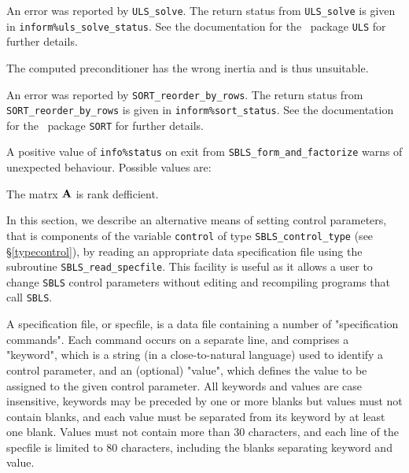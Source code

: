 \documentclass{galahad}
\newcommand{\packagename}{SBLS}
\begin{document}
\begin{description}
 An error was reported by {\tt ULS\_solve}. The return
status from {\tt ULS\_solve} is given in {\tt inform\%uls\_solve\_status}.
See the documentation for the \galahad\ package {\tt ULS} for further details.

 The computed preconditioner has the wrong 
inertia and is thus unsuitable.

 An error was reported by {\tt SORT\_reorder\_by\_rows}. 
The return status from {\tt SORT\_reorder\_by\_rows} 
is given in {\tt inform\%sort\_status}.
See the documentation for the \galahad\ package {\tt SORT} for further details.

\end{description}

A positive value of {\tt info\%status} on exit from 
{\tt \packagename\_form\_and\_factorize} warns of unexpected behaviour.
Possible values are:

\begin{description}

 The matrx ${\mathbf{A}}$ is rank defficient. 

\end{description}


\galfeatures
\noindent In this section, we describe an alternative means of setting 
control parameters, that is components of the variable {\tt control} of type
{\tt \packagename\_control\_type}
(see \S\ref{typecontrol}), 
by reading an appropriate data specification file using the
subroutine {\tt \packagename\_read\_specfile}. This facility
is useful as it allows a user to change  {\tt \packagename} control parameters 
without editing and recompiling programs that call {\tt \packagename}.

A specification file, or specfile, is a data file containing a number of 
"specification commands". Each command occurs on a separate line, 
and comprises a "keyword", 
which is a string (in a close-to-natural language) used to identify a 
control parameter, and 
an (optional) "value", which defines the value to be assigned to the given
control parameter. All keywords and values are case insensitive, 
keywords may be preceded by one or more blanks but
values must not contain blanks, and
each value must be separated from its keyword by at least one blank.
Values must not contain more than 30 characters, and 
each line of the specfile is limited to 80 characters,
including the blanks separating keyword and value.
\end{document}
